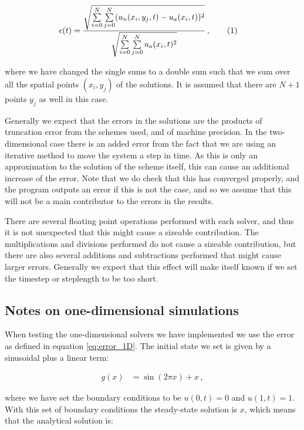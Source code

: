 \documentclass[reprint,english,notitlepage]{revtex4-1}  %
\newcommand\numberthis{\addtocounter{equation}{1}\tag{\theequation}}
\begin{document}
\begin{align*}
\epsilon(t) &= \frac{\sqrt{\sum\limits_{i=0}^N \sum\limits_{j=0}^N (u_n(x_i,y_j,t) - u_a(x_i,t))^2}}{\sqrt{\sum\limits_{i=0}^N \sum\limits_{j=0}^N u_a(x_i,t)^2}} \, , \numberthis \label{eq:error_2D}
\end{align*}

where we have changed the single sums to a double sum such that we sum over all the spatial points $(x_i,y_j)$ of the solutions. It is assumed that there are $N+1$ points $y_j$ as well in this case.

Generally we expect that the errors in the solutions are the products of truncation error from the schemes used, and of machine precision. In the two-dimensional case there is an added error from the fact that we are using an iterative method to move the system a step in time. As this is only an approximation to the solution of the scheme itself, this can cause an additional increase of the error. Note that we do check that this has converged properly, and the program outputs an error if this is not the case, and so we assume that this will not be a main contributor to the errors in the results.

There are several floating point operations performed with each solver, and thus it is not unexpected that this might cause a sizeable contribution. The multiplications and divisions performed do not cause a sizeable contribution, but there are also several additions and subtractions performed that might cause larger errors. Generally we expect that this effect will make itself known if we set the timestep or steplength to be too short.





\subsection{Notes on one-dimensional simulations} \label{sec:method_1D_sims}

When testing the one-dimensional solvers we have implemented we use the error as defined in equation \eqref{eq:error_1D}. The initial state we set is given by a sinusoidal plus a linear term:

\begin{align*}
g(x) &= \sin ( 2\pi x) + x \, ,
\end{align*}

where we have set the boundary conditions to be $u(0,t) = 0$ and $u(1,t) = 1$. With this set of boundary conditions the steady-state solution is $x$, which means that the analytical solution is:
\end{document}
